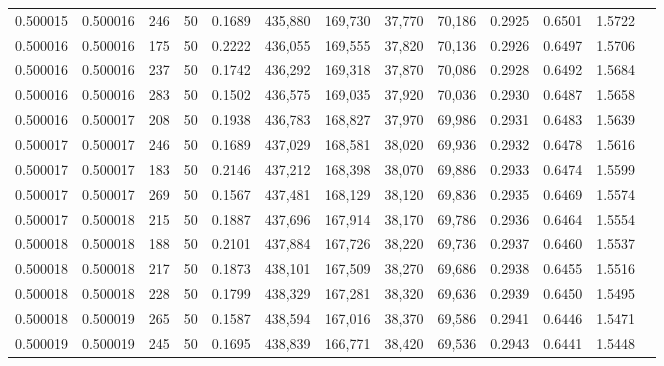\begin{tabular}{rrrrrrrrrrrrr}
0.500015 & 0.500016 &   246 &  50 &                                     0.1689 & 435,880 & 169,730 &  37,770 &  70,186 & 0.2925 & 0.6501 & 1.5722 \\
0.500016 & 0.500016 &   175 &  50 &                                     0.2222 & 436,055 & 169,555 &  37,820 &  70,136 & 0.2926 & 0.6497 & 1.5706 \\
0.500016 & 0.500016 &   237 &  50 &                                     0.1742 & 436,292 & 169,318 &  37,870 &  70,086 & 0.2928 & 0.6492 & 1.5684 \\
0.500016 & 0.500016 &   283 &  50 &                                     0.1502 & 436,575 & 169,035 &  37,920 &  70,036 & 0.2930 & 0.6487 & 1.5658 \\
0.500016 & 0.500017 &   208 &  50 &                                     0.1938 & 436,783 & 168,827 &  37,970 &  69,986 & 0.2931 & 0.6483 & 1.5639 \\
0.500017 & 0.500017 &   246 &  50 &                                     0.1689 & 437,029 & 168,581 &  38,020 &  69,936 & 0.2932 & 0.6478 & 1.5616 \\
0.500017 & 0.500017 &   183 &  50 &                                     0.2146 & 437,212 & 168,398 &  38,070 &  69,886 & 0.2933 & 0.6474 & 1.5599 \\
0.500017 & 0.500017 &   269 &  50 &                                     0.1567 & 437,481 & 168,129 &  38,120 &  69,836 & 0.2935 & 0.6469 & 1.5574 \\
0.500017 & 0.500018 &   215 &  50 &                                     0.1887 & 437,696 & 167,914 &  38,170 &  69,786 & 0.2936 & 0.6464 & 1.5554 \\
0.500018 & 0.500018 &   188 &  50 &                                     0.2101 & 437,884 & 167,726 &  38,220 &  69,736 & 0.2937 & 0.6460 & 1.5537 \\
0.500018 & 0.500018 &   217 &  50 &                                     0.1873 & 438,101 & 167,509 &  38,270 &  69,686 & 0.2938 & 0.6455 & 1.5516 \\
0.500018 & 0.500018 &   228 &  50 &                                     0.1799 & 438,329 & 167,281 &  38,320 &  69,636 & 0.2939 & 0.6450 & 1.5495 \\
0.500018 & 0.500019 &   265 &  50 &                                     0.1587 & 438,594 & 167,016 &  38,370 &  69,586 & 0.2941 & 0.6446 & 1.5471 \\
0.500019 & 0.500019 &   245 &  50 &                                     0.1695 & 438,839 & 166,771 &  38,420 &  69,536 & 0.2943 & 0.6441 & 1.5448 \\

\end{tabular}
